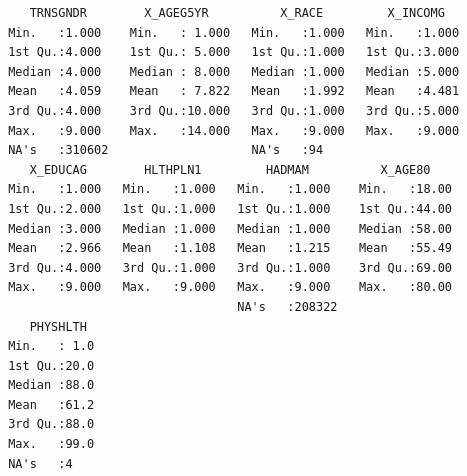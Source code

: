 \documentclass[
  letterpaper,
  DIV=11,
  numbers=noendperiod]{scrreprt}
\newenvironment{Shaded}{\begin{snugshade}}{\end{snugshade}}
\newcommand{\AttributeTok}[1]{\textcolor[rgb]{0.40,0.45,0.13}{#1}}
\newcommand{\CommentTok}[1]{\textcolor[rgb]{0.37,0.37,0.37}{#1}}
\newcommand{\DecValTok}[1]{\textcolor[rgb]{0.68,0.00,0.00}{#1}}
\newcommand{\FunctionTok}[1]{\textcolor[rgb]{0.28,0.35,0.67}{#1}}
\newcommand{\NormalTok}[1]{\textcolor[rgb]{0.00,0.23,0.31}{#1}}
\newcommand{\OtherTok}[1]{\textcolor[rgb]{0.00,0.23,0.31}{#1}}
\newcommand{\SpecialCharTok}[1]{\textcolor[rgb]{0.37,0.37,0.37}{#1}}
\newcommand{\StringTok}[1]{\textcolor[rgb]{0.13,0.47,0.30}{#1}}
\begin{document}
\begin{verbatim}
    TRNSGNDR        X_AGEG5YR          X_RACE         X_INCOMG    
 Min.   :1.000    Min.   : 1.000   Min.   :1.000   Min.   :1.000  
 1st Qu.:4.000    1st Qu.: 5.000   1st Qu.:1.000   1st Qu.:3.000  
 Median :4.000    Median : 8.000   Median :1.000   Median :5.000  
 Mean   :4.059    Mean   : 7.822   Mean   :1.992   Mean   :4.481  
 3rd Qu.:4.000    3rd Qu.:10.000   3rd Qu.:1.000   3rd Qu.:5.000  
 Max.   :9.000    Max.   :14.000   Max.   :9.000   Max.   :9.000  
 NA's   :310602                    NA's   :94                     
    X_EDUCAG        HLTHPLN1         HADMAM          X_AGE80     
 Min.   :1.000   Min.   :1.000   Min.   :1.000    Min.   :18.00  
 1st Qu.:2.000   1st Qu.:1.000   1st Qu.:1.000    1st Qu.:44.00  
 Median :3.000   Median :1.000   Median :1.000    Median :58.00  
 Mean   :2.966   Mean   :1.108   Mean   :1.215    Mean   :55.49  
 3rd Qu.:4.000   3rd Qu.:1.000   3rd Qu.:1.000    3rd Qu.:69.00  
 Max.   :9.000   Max.   :9.000   Max.   :9.000    Max.   :80.00  
                                 NA's   :208322                  
    PHYSHLTH   
 Min.   : 1.0  
 1st Qu.:20.0  
 Median :88.0  
 Mean   :61.2  
 3rd Qu.:88.0  
 Max.   :99.0  
 NA's   :4     
\end{verbatim}

\begin{Shaded}
\end{Shaded}
\end{document}
